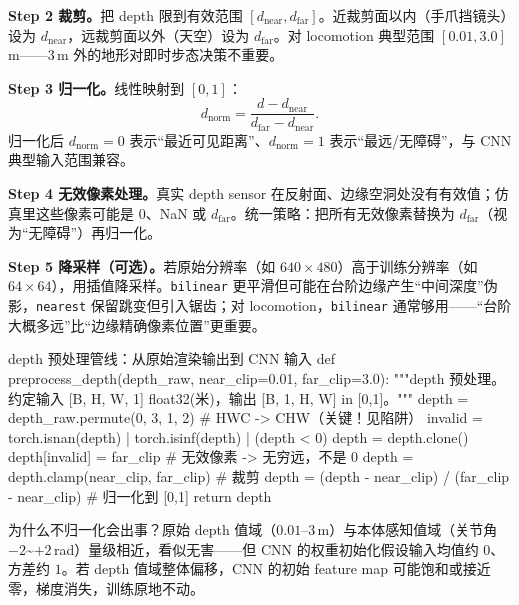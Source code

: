 \textbf{Step 2 裁剪。}把 depth 限到有效范围 $[d_{\text{near}}, d_{\text{far}}]$。近裁剪面以内（手爪挡镜头）设为 $d_{\text{near}}$，远裁剪面以外（天空）设为 $d_{\text{far}}$。对 locomotion 典型范围 $[0.01, 3.0]$\,m——$3$\,m 外的地形对即时步态决策不重要。

\textbf{Step 3 归一化。}线性映射到 $[0,1]$：
\begin{equation}
d_{\text{norm}} = \frac{d - d_{\text{near}}}{d_{\text{far}} - d_{\text{near}}}.
\label{eq:rlmc-vm-norm}
\end{equation}
归一化后 $d_{\text{norm}}=0$ 表示“最近可见距离”、$d_{\text{norm}}=1$ 表示“最远/无障碍”，与 CNN 典型输入范围兼容。

\textbf{Step 4 无效像素处理。}真实 depth sensor 在反射面、边缘空洞处没有有效值；仿真里这些像素可能是 $0$、NaN 或 $d_{\text{far}}$。统一策略：把所有无效像素替换为 $d_{\text{far}}$（视为“无障碍”）再归一化。

\textbf{Step 5 降采样（可选）。}若原始分辨率（如 $640\times480$）高于训练分辨率（如 $64\times64$），用插值降采样。\verb|bilinear| 更平滑但可能在台阶边缘产生“中间深度”伪影，\verb|nearest| 保留跳变但引入锯齿；对 locomotion，\verb|bilinear| 通常够用——“台阶大概多远”比“边缘精确像素位置”更重要。

\begin{codebox}[Python]{depth 预处理管线：从原始渲染输出到 CNN 输入}
def preprocess_depth(depth_raw, near_clip=0.01, far_clip=3.0):
    """depth 预处理。约定输入 [B, H, W, 1] float32(米)，输出 [B, 1, H, W] in [0,1]。"""
    depth = depth_raw.permute(0, 3, 1, 2)          # HWC -> CHW（关键！见陷阱）
    invalid = torch.isnan(depth) | torch.isinf(depth) | (depth < 0)
    depth = depth.clone()
    depth[invalid] = far_clip                       # 无效像素 -> 无穷远，不是 0
    depth = depth.clamp(near_clip, far_clip)        # 裁剪
    depth = (depth - near_clip) / (far_clip - near_clip)  # 归一化到 [0,1]
    return depth
\end{codebox}

为什么不归一化会出事？原始 depth 值域（$0.01$--$3$\,m）与本体感知值域（关节角 $-2$\textasciitilde$+2$\,rad）量级相近，看似无害——但 CNN 的权重初始化假设输入均值约 $0$、方差约 $1$。若 depth 值域整体偏移，CNN 的初始 feature map 可能饱和或接近零，梯度消失，训练原地不动。

